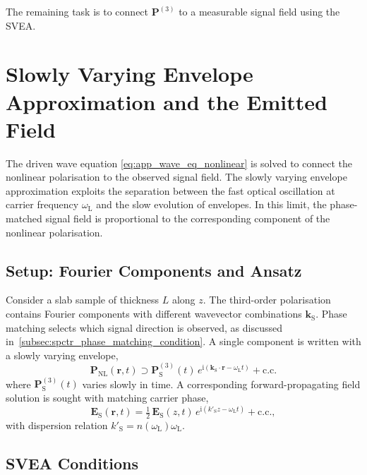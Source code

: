 The remaining task is to connect $\boldsymbol{P}^{(3)}$ to a measurable signal field using the SVEA.

\section{Slowly Varying Envelope Approximation and the Emitted Field}
\label{app:sec:svea}

The driven wave equation \autoref{eq:app_wave_eq_nonlinear} is solved to connect the nonlinear polarisation to the observed signal field. The slowly varying envelope approximation exploits the separation between the fast optical oscillation at carrier frequency $\omega_{\mathrm{L}}$ and the slow evolution of envelopes. In this limit, the phase-matched signal field is proportional to the corresponding component of the nonlinear polarisation.

\subsection{Setup: Fourier Components and Ansatz}
\label{app:subsec:fourier_ansatz}

Consider a slab sample of thickness $L$ along $z$. The third-order polarisation contains Fourier components with different wavevector combinations $\boldsymbol{k}_\text{S}$. Phase matching selects which signal direction is observed, as discussed in~\autoref{subsec:spctr_phase_matching_condition}. A single component is written with a slowly varying envelope,
\begin{equation}
	\boldsymbol{P}_{\mathrm{NL}}(\boldsymbol{r},t) \supset \boldsymbol{P}_{\mathrm{S}}^{(3)}(t)\,e^{\mathrm{i}(\boldsymbol{k}_\text{S}\cdot\boldsymbol{r}-\omega_{\mathrm{L}} t)} + \text{c.c.}
	\label{eq:app_pol_component}
\end{equation}
where $\boldsymbol{P}_{\mathrm{S}}^{(3)}(t)$ varies slowly in time. 
A corresponding forward-propagating field solution is sought with matching carrier phase,
\begin{equation}
	\boldsymbol{E}_{\mathrm{S}}(\boldsymbol{r},t) = \tfrac{1}{2}\,\boldsymbol{E}_{\mathrm{S}}(z,t)\,e^{\mathrm{i}(k'_{\mathrm{S}} z-\omega_{\mathrm{L}} t)} + \text{c.c.},
	\label{eq:app_field_ansatz}
\end{equation}
with dispersion relation $k'_{\mathrm{S}}=n(\omega_{\mathrm{L}})\omega_{\mathrm{L}}$.

\subsection{SVEA Conditions}
\label{app:subsec:svea_conditions}

